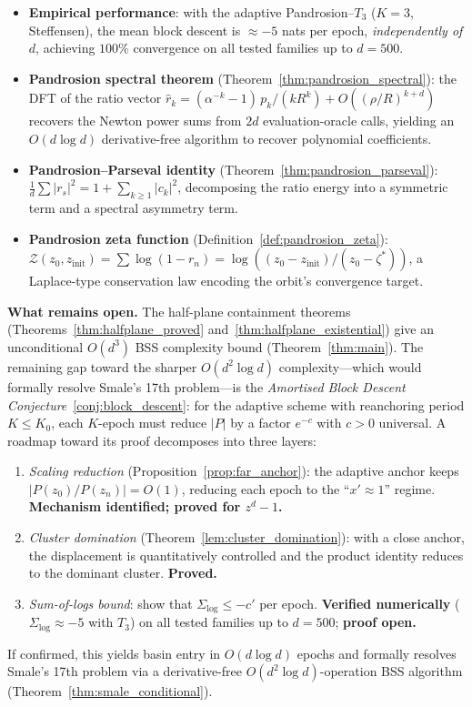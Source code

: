 \documentclass[10pt,a4paper,oneside]{book}
\theoremstyle{definition}
\theoremstyle{remark}
\begin{document}
\begin{itemize}
  \item \textbf{Empirical performance}: with the adaptive Pandrosion--$T_3$ ($K=3$, Steffensen), the mean block descent is $\approx -5$ nats per epoch, \emph{independently of $d$}, achieving $100\%$ convergence on all tested families up to $d = 500$.
  \item \textbf{Pandrosion spectral theorem} (Theorem~\ref{thm:pandrosion_spectral}): the DFT of the ratio vector $\hat{r}_k = (\alpha^{-k}-1)\,p_k/(kR^k) + O((\rho/R)^{k+d})$ recovers the Newton power sums from $2d$ evaluation-oracle calls, yielding an $O(d\log d)$ derivative-free algorithm to recover polynomial coefficients.
  \item \textbf{Pandrosion--Parseval identity} (Theorem~\ref{thm:pandrosion_parseval}): $\tfrac{1}{d}\sum|r_s|^2 = 1 + \sum_{k\geq 1}|c_k|^2$, decomposing the ratio energy into a symmetric term and a spectral asymmetry term.
  \item \textbf{Pandrosion zeta function} (Definition~\ref{def:pandrosion_zeta}): $\mathscr{Z}(z_0, z_{\mathrm{init}}) = \sum\log(1-r_n) = \log((z_0-z_{\mathrm{init}})/(z_0-\zeta^*))$, a Laplace-type conservation law encoding the orbit's convergence target.
\end{itemize}

\medskip

\textbf{What remains open.}  The half-plane containment theorems (Theorems~\ref{thm:halfplane_proved} and~\ref{thm:halfplane_existential}) give an unconditional $O(d^3)$ BSS complexity bound (Theorem~\ref{thm:main}).  The remaining gap toward the sharper $O(d^2\log d)$ complexity---which would formally resolve Smale's 17th problem---is the \emph{Amortised Block Descent Conjecture}~\ref{conj:block_descent}: for the adaptive scheme with reanchoring period $K \leq K_0$, each $K$-epoch must reduce $|P|$ by a factor $e^{-c}$ with $c > 0$ universal.  A roadmap toward its proof decomposes into three layers:
\begin{enumerate}
  \item \emph{Scaling reduction} (Proposition~\ref{prop:far_anchor}): the adaptive anchor keeps $|P(z_0)/P(z_n)| = O(1)$, reducing each epoch to the ``$x' \approx 1$'' regime.  \textbf{Mechanism identified; proved for $z^d-1$.}
  \item \emph{Cluster domination} (Theorem~\ref{lem:cluster_domination}): with a close anchor, the displacement is quantitatively controlled and the product identity reduces to the dominant cluster.  \textbf{Proved.}
  \item \emph{Sum-of-logs bound}: show that $\Sigma_{\log} \leq -c'$ per epoch.  \textbf{Verified numerically} ($\Sigma_{\log} \approx -5$ with $T_3$) on all tested families up to $d = 500$; \textbf{proof open.}
\end{enumerate}
If confirmed, this yields basin entry in $O(d\log d)$ epochs and formally resolves Smale's 17th problem via a derivative-free $O(d^2\log d)$-operation BSS algorithm (Theorem~\ref{thm:smale_conditional}).
\end{document}

